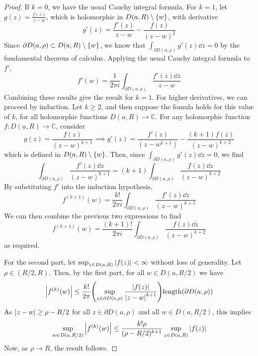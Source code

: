\begin{proof}
	If \( k = 0 \), we have the usual Cauchy integral formula.
	For \( k = 1 \), let \( g(z) = \frac{f(z)}{z-w} \), which is holomorphic in \( D(a,R) \setminus \qty{w} \), with derivative
	\[ g'(z) = \frac{f'(z)}{z-w} - \frac{f(z)}{(z-w)^2} \]
	Since \( \partial D(a,\rho) \subset D(a,R) \setminus \qty{w} \), we know that \( \int_{\partial D(a,\rho)} g'(z) \dd{z} = 0 \) by the fundamental theorem of calculus.
	Applying the usual Cauchy integral formula to \( f' \),
	\[ f'(w) = \frac{1}{2\pi i}\int_{\partial D(a,\rho)} \frac{f'(z) \dd{z}}{z-w} \]
	Combining these results give the result for \( k = 1 \).
	For higher derivatives, we can proceed by induction.
	Let \( k \geq 2 \), and then suppose the fomula holds for this value of \( k \), for all holomorphic functions \( D(a,R) \to \mathbb C \).
	For any holomorphic function \( f \colon D(a,R) \to \mathbb C \), consider
	\[ g(z) = \frac{f(z)}{(z-w)^{k+1}} \implies g'(z) = \frac{f'(z)}{(z-w^{k+1})} - \frac{(k+1)f(z)}{(z-w)^{k+2}} \]
	which is defined in \( D(a,R) \setminus \qty{w} \).
	Then, since \( \int_{\partial D(a,\rho)} g'(z) \dd{z} = 0 \), we find
	\[ \int_{\partial D(a,\rho)} \frac{f'(z) \dd{z}}{(z-w)^{k+1}} = (k+1) \int_{\partial D(a,\rho)} \frac{f(z) \dd{z}}{(z-w)^{k+2}} \]
	By substituting \( f' \) into the induction hypothesis,
	\[ f^{(k+1)}(w) = \frac{k!}{2\pi i} \int_{\partial D(a,\rho)} \frac{f'(z) \dd{z}}{(z-w)^{k+1}} \]
	We can then combine the previous two expressions to find
	\[ f^{(k+1)}(w) = \frac{(k+1)!}{2\pi i} \int_{\partial D(a,\rho)} \frac{f(z) \dd{z}}{(z-w)^{k+2}} \]
	as required.

	For the second part, let \( \sup_{z \in D(a,R)} \abs{f(z)} < \infty \) without loss of generality.
	Let \( \rho \in (R/2, R) \).
	Then, by the first part, for all \( w \in D(a,R/2) \) we have
	\[ \abs{f^{(k)}(w)} \leq \frac{k!}{2\pi} \qty(\sup_{z \in \partial D(a,\rho)} \frac{\abs{f(z)}}{\abs{z-w}^{k+1}}) \mathrm{length}(\partial D(a,\rho)) \]
	As \( \abs{z-w} \geq \rho - R/2 \) for all \( z \in \partial D(a,\rho) \) and all \( w \in D(a,R/2) \), this implies
	\[ \sup_{w \in D(a,R/2)} \abs{f^{(k)}(w)} \leq \frac{k!\rho}{(\rho - R/2)^{k+1}} \sup_{z \in D(a,R)} \abs{f(z)} \]
	Now, as \( \rho \to R \), the result follows.
\end{proof}

